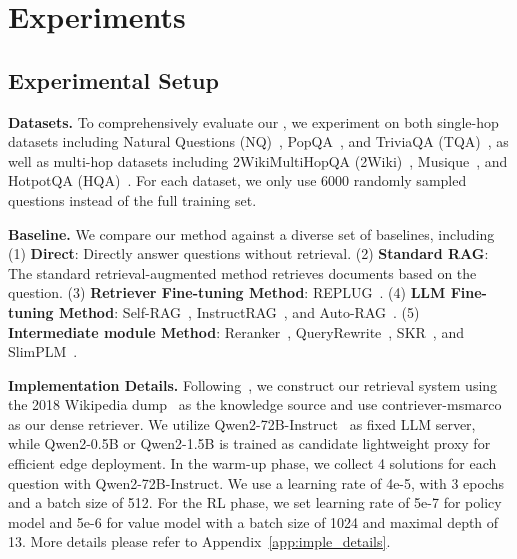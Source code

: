 \section{Experiments}


\subsection{Experimental Setup}

\textbf{Datasets.} To comprehensively evaluate our \modelname, we experiment on both single-hop datasets including Natural Questions (NQ)~\citep{KwiatkowskiPRCP19}, PopQA~\citep{mallen-etal-2023-trust}, and TriviaQA (TQA)~\citep{joshi-etal-2017-triviaqa}, as well as multi-hop datasets including 2WikiMultiHopQA (2Wiki)~\citep{ho-etal-2020-constructing}, Musique~\citep{trivedi-etal-2022-musique}, and HotpotQA (HQA)~\citep{yang-etal-2018-hotpotqa}.
For each dataset, we only use 6000 randomly sampled questions instead of the full training set.



\textbf{Baseline.}
We compare our method against a diverse set of baselines, including
(1) \textbf{Direct}: Directly answer questions without retrieval.
(2) \textbf{Standard RAG}: The standard retrieval-augmented method retrieves documents based on the question.
(3) \textbf{Retriever Fine-tuning Method}: REPLUG~\citep{ShiMYS0LZY24}.
(4) \textbf{LLM Fine-tuning Method}: Self-RAG~\citep{AsaiWWSH24}, InstructRAG~\citep{abs-2406-13629}, and Auto-RAG~\citep{auto-rag}.
(5) \textbf{Intermediate module Method}: Reranker~\citep{gte}, QueryRewrite~\citep{MaGHZD23}, SKR~\citep{WangLSL23}, and SlimPLM~\citep{TanD0GFW24}.

\textbf{Implementation Details.}
Following~\citet{AsaiWWSH24}, we construct our retrieval system using the 2018 Wikipedia dump~\citep{yang-etal-2018-hotpotqa} as the knowledge source and use contriever-msmarco~\citep{IzacardCHRBJG22} as our dense retriever.
We utilize Qwen2-72B-Instruct~\citep{qwen2} as fixed LLM server, while Qwen2-0.5B or Qwen2-1.5B is trained as candidate lightweight proxy for efficient edge deployment.
In the warm-up phase, we collect 4 solutions for each question with Qwen2-72B-Instruct.
We use a learning rate of 4e-5, with 3 epochs and a batch size of 512.
For the RL phase, we set learning rate of 5e-7 for policy model and 5e-6 for value model with a batch size of 1024 and maximal depth of 13.
More details please refer to Appendix~\ref{app:imple_details}.

